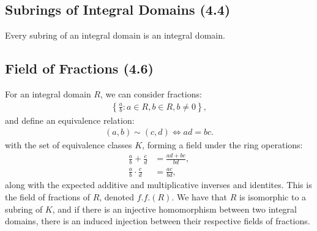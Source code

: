 \subsection{Subrings of Integral Domains (4.4)} \label{4.4}

Every subring of an integral domain is an integral domain.

\newpage

\subsection{Field of Fractions (4.6)} \label{4.6}

For an integral domain $R$, we can consider fractions: \begin{align*}
    \left\{\frac{a}{b} : a \in R, b \in R, b \neq 0\right\},
\end{align*} and define an equivalence relation: \begin{align*}
    (a, b) \sim (c, d) \Longleftrightarrow ad = bc.
\end{align*} with the set of equivalence classes $K$, forming
a field under the ring operations: \begin{align*}
    \frac{a}{b} + \frac{c}{d} &= \frac{ad + bc}{bd}, \\[2mm]
    \frac{a}{b} \cdot \frac{c}{d} &= \frac{ac}{bd},
\end{align*} along with the expected additive and multiplicative
inverses and identites. This is the field of fractions of $R$,
denoted $f.f.(R)$. We have that $R$ is isomorphic to a subring
of $K$, and if there is an injective homomorphism between
two integral domains, there is an induced injection between
their respective fields of fractions.
